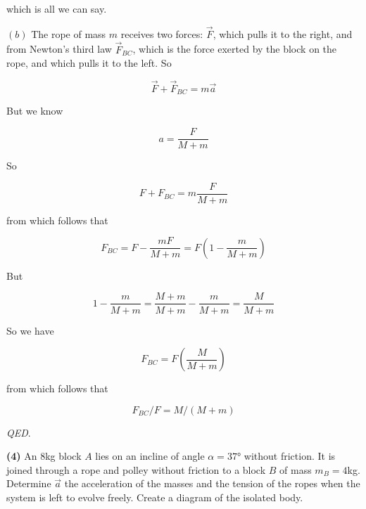 \documentclass[12pt]{article}
\theoremstyle{definition}
\begin{document}
which is all we can say.

$(b)$ The rope of mass $m$ receives two forces: $\vec{F}$, which pulls it to the
right, and from Newton's third law $\vec{F}_{BC}$, which is the force exerted by 
the block on the rope, and which pulls it to the left. So 

\begin{equation}
    \vec{F} + \vec{F}_{BC} = m \vec{a}
\end{equation}

But we know

\begin{equation}
    a = \frac{F}{M + m}
\end{equation}

So 

\begin{equation}
    F + F_{BC} = m \frac{F}{M + m}
\end{equation}

from which follows that 

\begin{equation}
    F_{BC} = F - \frac{mF}{M + m}  = F\left(1 - \frac{m}{M + m} \right)
\end{equation}

But 

\begin{equation}
    1 - \frac{m}{M + m}  = \frac{M+m}{M + m} - \frac{m}{M + m}  = \frac{M}{M + m}
\end{equation}

So we have 

\begin{equation}
    F_{BC} = F\left( \frac{M}{M+m} \right) 
\end{equation}

from which follows that 

\begin{equation}
    F_{BC}/F = M / (M+m)
\end{equation}

\textit{QED}.


\pagebreak 

\begin{shaded}
    \textbf{(4)} An 8kg block $A$ lies on an incline of angle $\alpha =
    \ang{37}$ without friction. It is joined through a rope and polley without
    friction to a block $B$ of mass $m_B = 4$kg. Determine $\vec{a}$ the
    acceleration of the masses and the tension of the ropes when the system is
    left to evolve freely. Create a diagram of the isolated body.
\end{shaded}
\end{document}
